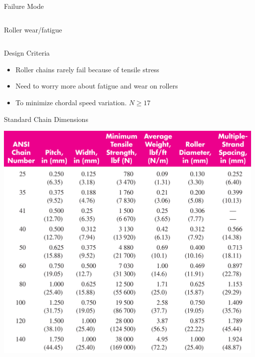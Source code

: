 \documentclass[10pt, svgnames]{beamer}
\begin{document}
\begin{frame}[label={sec:orgd3362c8}]{Failure Mode}
\begin{columns}
\begin{column}{0.5\columnwidth}
Roller wear/fatigue
\end{column}
\end{columns}
\end{frame}

\begin{frame}[label={sec:org18b1e66}]{Design Criteria}
\begin{itemize}
\item Roller chains rarely fail because of tensile stress
\item Need to worry more about fatigue and wear on rollers
\item To minimize chordal speed variation. \(N \geqslant 17\)
\end{itemize}
\end{frame}

\begin{frame}[label={sec:org151669d}]{Standard Chain Dimensions}
\begin{center}
\includegraphics[height=0.9\textheight]{./pictures/chain-ansi-dims.png}
\end{center}
\end{frame}
\end{document}
